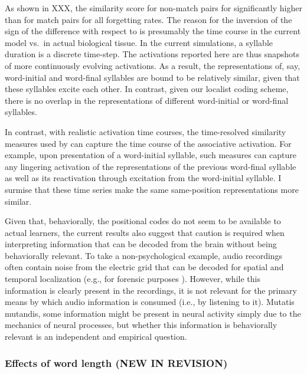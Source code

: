 \documentclass[
]{article}
\begin{document}
As shown in XXX, the similarity score for non-match pairs for
significantly higher than for match pairs for all forgetting rates. The
reason for the inversion of the sign of the difference with respect to
\citep{Henin2021} is presumably the time course in the current model
vs.~in actual biological tissue. In the current simulations, a syllable
duration is a discrete time-step. The activations reported here are thus
snapshots of more continuously evolving activations. As a result, the
representations of, say, word-initial and word-final syllables are bound
to be relatively similar, given that these syllables excite each other.
In contrast, given our localist coding scheme, there is no overlap in
the representations of different word-initial or word-final syllables.

In contrast, with realistic activation time courses, the time-resolved
similarity measures used by \citep{Henin2021} can capture the time
course of the associative activation. For example, upon presentation of
a word-initial syllable, such measures can capture any lingering
activation of the representations of the previous word-final syllable as
well as its reactivation through excitation from the word-initial
syllable. I surmise that these time series make the same same-position
representations more similar.

Given that, behaviorally, the positional codes do not seem to be
available to actual learners, the current results also suggest that
caution is required when interpreting information that can be decoded
from the brain without being behaviorally relevant. To take a
non-psychological example, audio recordings often contain noise from the
electric grid that can be decoded for spatial and temporal localization
(e.g., for forensic purposes \citep{Grigoras2005}). However, while this
information is clearly present in the recordings, it is not relevant for
the primary means by which audio information is consumed (i.e., by
listening to it). Mutatis mutandis, some information might be present in
neural activity simply due to the mechanics of neural processes, but
whether this information is behaviorally relevant is an independent and
empirical question.

\hypertarget{effects-of-word-length-new-in-revision}{%
\subsubsection{Effects of word length (NEW IN
REVISION)}\label{effects-of-word-length-new-in-revision}}
\end{document}
